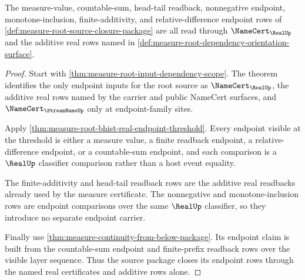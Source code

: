 \begin{theorem}
\label{thm:measure-root-source-endpoint-row-closure}
The measure-value, countable-sum, head-tail readback, nonnegative endpoint,
monotone-inclusion, finite-additivity, and relative-difference endpoint rows of
\autoref{def:measure-root-source-closure-package} are all read through
$\NameCert_{\RealUp}$ and the additive real rows named in
\autoref{def:measure-root-dependency-orientation-surface}.
\end{theorem}
\begin{proof}
Start with \autoref{thm:measure-root-input-dependency-scope}. The theorem
identifies the only endpoint inputs for the root source as
$\NameCert_{\RealUp}$, the additive real rows named by the carrier and public
NameCert surfaces, and $\NameCert_{\StreamNameUp}$ only at endpoint-family
sites.

Apply \autoref{thm:measure-root-bhist-real-endpoint-threshold}. Every endpoint
visible at the threshold is either a measure value, a finite readback endpoint,
a relative-difference endpoint, or a countable-sum endpoint, and each
comparison is a $\RealUp$ classifier comparison rather than a host event
equality.

The finite-additivity and head-tail readback rows are the additive real
readbacks already used by the measure certificate. The nonnegative and
monotone-inclusion rows are endpoint comparisons over the same $\RealUp$
classifier, so they introduce no separate endpoint carrier.

Finally use \autoref{thm:measure-continuity-from-below-package}. Its endpoint
claim is built from the countable-sum endpoint and finite-prefix readback rows
over the visible layer sequence. Thus the source package closes its endpoint
rows through the named real certificates and additive rows alone.
\end{proof}

